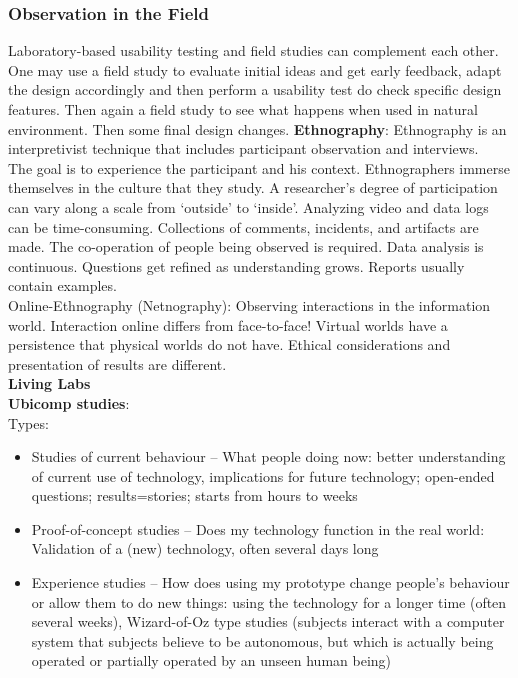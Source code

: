 \subsubsection{Observation in the Field}
Laboratory-based usability testing and field studies can complement each other. One may use a field study to evaluate initial ideas and get early feedback, adapt the design accordingly and then perform a usability test do check specific design features. Then again a field study to see what happens when used in natural environment. Then some final design changes. 
\textbf{Ethnography}:
Ethnography is an interpretivist technique that includes participant observation and interviews.\\
The goal is to experience the participant and his context. Ethnographers immerse themselves in the culture that they study. A researcher's degree of participation can vary along a scale
from `outside' to `inside'. Analyzing video and data logs can be time-consuming. Collections of comments, incidents, and artifacts are made.
The co-operation of people being observed is required. Data analysis is continuous. Questions get refined as understanding grows. Reports usually contain examples.\\
Online-Ethnography (Netnography): Observing interactions in the information world. Interaction online differs from face-to-face! Virtual worlds have a persistence that physical worlds do not have. Ethical considerations and presentation of results are different.\\

\textbf{Living Labs}\\
\textbf{Ubicomp studies}:\\
Types:
\begin{itemize}
\item Studies of current behaviour -- What people doing now: better understanding of current use of technology, implications for future technology; open-ended questions; results=stories; starts from hours to weeks
\item Proof-of-concept studies -- Does my technology function in the real world: Validation of a (new) technology, often several days long
\item Experience studies -- How does using my prototype change people's behaviour or allow them to do new things: using the technology for a longer time (often several weeks), Wizard-of-Oz type studies (subjects interact with a computer system that subjects believe to be autonomous, but which is actually being operated or partially operated by an unseen human being)
\end{itemize}

